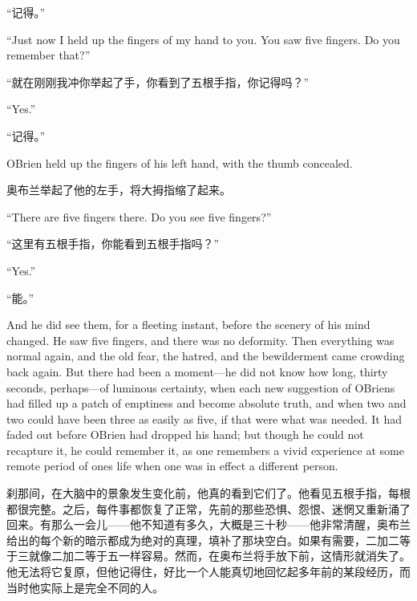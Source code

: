 \begin{paracol}{2}
\switchcolumn

``记得。''

\switchcolumn*

``Just now I held up the fingers of my hand to you. You saw five fingers.
Do you remember that?''

\switchcolumn

``就在刚刚我冲你举起了手，你看到了五根手指，你记得吗？''

\switchcolumn*

``Yes.''

\switchcolumn

``记得。''

\switchcolumn*

O\textquotesingle Brien held up the fingers of his left hand, with the
thumb concealed.

\switchcolumn

奥布兰举起了他的左手，将大拇指缩了起来。

\switchcolumn*

``There are five fingers there. Do you see five fingers?''

\switchcolumn

``这里有五根手指，你能看到五根手指吗？''

\switchcolumn*

``Yes.''

\switchcolumn

``能。''

\switchcolumn*

And he did see them, for a fleeting instant, before the scenery of his
mind changed. He saw five fingers, and there was no deformity. Then
everything was normal again, and the old fear, the hatred, and the
bewilderment came crowding back again. But there had been a moment---he
did not know how long, thirty seconds, perhaps---of luminous certainty,
when each new suggestion of O\textquotesingle Brien\textquotesingle s
had filled up a patch of emptiness and become absolute truth, and when
two and two could have been three as easily as five, if that were what
was needed. It had faded out before O\textquotesingle Brien had dropped
his hand; but though he could not recapture it, he could remember it, as
one remembers a vivid experience at some remote period of
one\textquotesingle s life when one was in effect a different person.

\switchcolumn

刹那间，在大脑中的景象发生变化前，他真的看到它们了。他看见五根手指，每根都很完整。之后，每件事都恢复了正常，先前的那些恐惧、怨恨、迷惘又重新涌了回来。有那么一会儿——他不知道有多久，大概是三十秒——他非常清醒，奥布兰给出的每个新的暗示都成为绝对的真理，填补了那块空白。如果有需要，二加二等于三就像二加二等于五一样容易。然而，在奥布兰将手放下前，这情形就消失了。他无法将它复原，但他记得住，好比一个人能真切地回忆起多年前的某段经历，而当时他实际上是完全不同的人。


\end{paracol}
